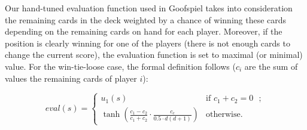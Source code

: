 
Our hand-tuned evaluation function used in Goofspiel takes into consideration the remaining cards in the deck weighted by a chance of winning these cards depending on the remaining cards on hand for each player. 
Moreover, if the position is clearly winning for one of the players (there is not enough cards to change the current score), the evaluation function is set to maximal (or minimal) value.
For the win-tie-loose case, the formal definition follows ($c_i$ are the sum of values the remaining cards of player $i$):

\[
eval(s) = \left\{ \begin{array}{ll}
  u_1(s) & \mbox{if $c_1 + c_2 = 0$ };\\
  \tanh\left(\frac{c_1 - c_2}{c_1 + c_2}\cdot\frac{c_c}{0.5 \cdot d(d+1)}\right) & \mbox{otherwise.} \end{array} \right.
\]


